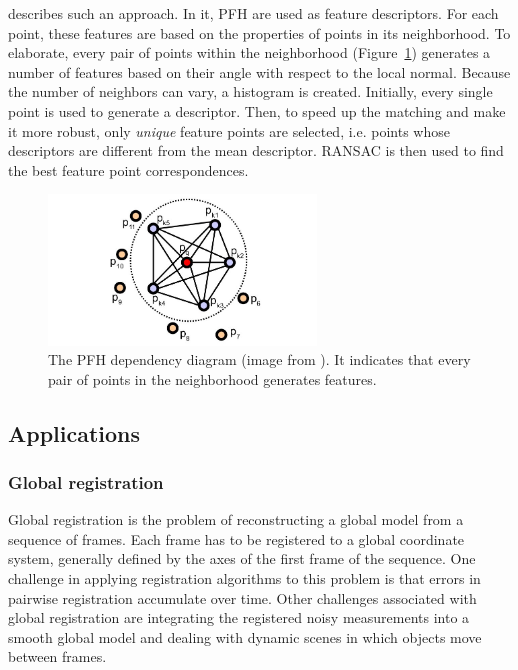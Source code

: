 \documentclass[a4paper]{article}
\begin{document}
\cite{rusu2009fast} describes such an approach. In it, \ac{PFH} are used as feature descriptors. For each point, these features are based on the properties of points in its neighborhood. To elaborate, every pair of points within the neighborhood (Figure~\ref{fig:fpfh}) generates a number of features based on their angle with respect to the local normal. Because the number of neighbors can vary, a histogram is created. Initially, every single point is used to generate a descriptor. Then, to speed up the matching and make it more robust, only \emph{unique} feature points are selected, i.e. points whose descriptors are different from the mean descriptor. \ac{RANSAC} is then used to find the best feature point correspondences.  

\begin{figure}[htbp]
    \centering
        \includegraphics[height=4cm]{ims/fpfh.jpg}
    \caption{The PFH dependency diagram (image from \cite{rusu2009fast}). It indicates that every pair of points in the neighborhood generates features.}
    \label{fig:fpfh}
\end{figure}

\subsection{Applications}

\subsubsection{Global registration}

Global registration is the problem of reconstructing a global model from a sequence of frames. Each frame has to be registered to a global coordinate system, generally defined by the axes of the first frame of the sequence. One challenge in applying registration algorithms to this problem is that errors in pairwise registration accumulate over time. Other challenges associated with global registration are integrating the registered noisy measurements into a smooth global model and dealing with dynamic scenes in which objects move between frames.
\end{document}
